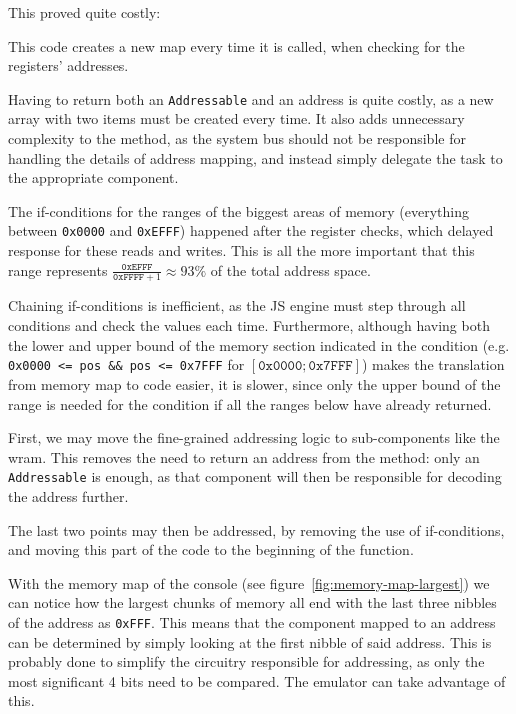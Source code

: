\documentclass[11pt]{informatics-report}
\begin{document}
This proved quite costly:
\begin{compactitem}
    \item This code creates a new map every time it is called, when checking for the registers' addresses.
    \item Having to return both an \texttt{Addressable} and an address is quite costly, as a new array with two items must be created every time. It also adds unnecessary complexity to the method, as the system bus should not be responsible for handling the details of address mapping, and instead simply delegate the task to the appropriate component.
    \item The if-conditions for the ranges of the biggest areas of memory (everything between \texttt{0x0000} and \texttt{0xEFFF}) happened after the register checks, which delayed response for these reads and writes. This is all the more important that this range represents $\frac{\texttt{0xEFFF}}{\texttt{0xFFFF}+1} \approx 93\%$ of the total address space.
    \item Chaining if-conditions is inefficient, as the JS engine must step through all conditions and check the values each time. Furthermore, although having both the lower and upper bound of the memory section indicated in the condition (e.g. \texttt{0x0000 <= pos \&\& pos <= 0x7FFF} for $[\texttt{0x0000}; \texttt{0x7FFF}]$) makes the translation from memory map to code easier, it is slower, since only the upper bound of the range is needed for the condition if all the ranges below have already returned.
\end{compactitem}

First, we may move the fine-grained addressing logic to sub-components like the \gls{wram}. This removes the need to return an address from the method: only an \texttt{Addressable} is enough, as that component will then be responsible for decoding the address further.

The last two points may then be addressed, by removing the use of if-conditions, and moving this part of the code to the beginning of the function.

With the memory map of the console (see figure~\ref{fig:memory-map-largest}) we can notice how the largest chunks of memory all end with the last three nibbles of the address as \texttt{0xFFF}. This means that the component mapped to an address can be determined by simply looking at the first nibble of said address. This is probably done to simplify the circuitry responsible for addressing, as only the most significant 4 bits need to be compared. The emulator can take advantage of this.
\end{document}
